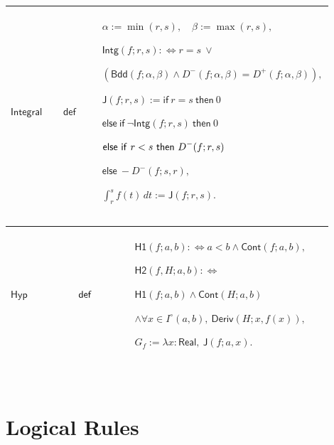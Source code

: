 \documentclass[12pt,reqno]{amsart}
\theoremstyle{blueplain}
\numberwithin{equation}{section}
\begin{document}
{\scriptsize \setlength{\parskip}{0pt}\nointerlineskip
\noindent 
\begin{tabular}{|@{}>{\centering\arraybackslash}m{0.19251\linewidth}|>{\centering\arraybackslash}m{0.16845\linewidth}|>{\centering\arraybackslash}m{0.53904\linewidth}|}
\hline
\hypertarget{def:Integral}{$\displaystyle \mathsf{Integral}$} & $%
\displaystyle \mathsf{def}$ & $\displaystyle \alpha:=\min(r,s),\quad\beta:=%
\max(r,s),$\par$\displaystyle \mathsf{Intg}(f;r,s):\Longleftrightarrow r=s\
\lor$\par$\displaystyle (\mathsf{Bdd}(f;\alpha,\beta)\land
D^-(f;\alpha,\beta)=D^+(f;\alpha,\beta)),$\par$\displaystyle \mathsf{J}%
(f;r,s):=\mathsf{if}\ r=s\ \mathsf{then}\ 0$\par$\displaystyle \mathsf{else\
if}\ \neg\mathsf{Intg}(f;r,s)\ \mathsf{then}\ 0$\par$\displaystyle \mathsf{%
else\ if}\ r<s\ \mathsf{then}\ D^-(f;r,s)$\par$\displaystyle \mathsf{else}\
-D^-(f;s,r),$\par$\displaystyle \int_r^s f(t)\,dt:=\mathsf{J}(f;r,s).$ \\ 
\hline
\end{tabular}%
}

{\scriptsize \setlength{\parskip}{0pt}\nointerlineskip
\noindent 
\begin{tabular}{|@{}>{\centering\arraybackslash}m{0.19251\linewidth}|>{\centering\arraybackslash}m{0.16845\linewidth}|>{\centering\arraybackslash}m{0.53904\linewidth}|}
\hline
\hypertarget{def:Hyp}{$\displaystyle \mathsf{Hyp}$} & $\displaystyle \mathsf{%
def}$ & $\displaystyle \mathsf{H1}(f;a,b):\Longleftrightarrow a<b\land%
\mathsf{Cont}(f;a,b),$\par$\displaystyle \mathsf{H2}(f,H;a,b):%
\Longleftrightarrow$\par$\displaystyle \mathsf{H1}(f;a,b)\land\mathsf{Cont}%
(H;a,b)$\par$\displaystyle \land\forall x\in I^\circ(a,b),\ \mathsf{Deriv}%
(H;x,f(x)),$\par$\displaystyle G_f:=\lambda x:\mathsf{Real},\ \mathsf{J}%
(f;a,x).$ \\ \hline
\end{tabular}%
}

{\scriptsize \ }

\section{\protect\scriptsize Logical Rules}
\end{document}
